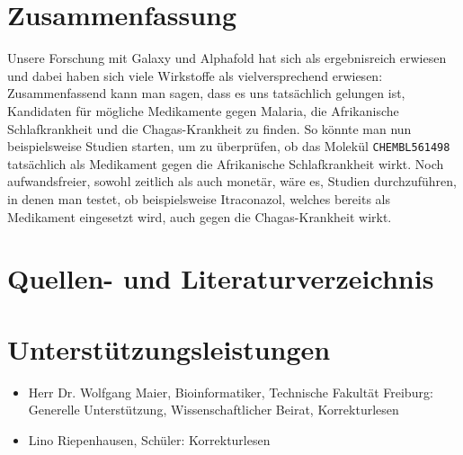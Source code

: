 \documentclass[10pt]{article}
\begin{document}
    \section{Zusammenfassung}\label{sec:zusammenfassung}
    Unsere Forschung mit Galaxy und Alphafold hat sich als ergebnisreich erwiesen und dabei haben sich viele
    Wirkstoffe als vielversprechend erwiesen: Zusammenfassend kann man sagen, dass es uns tatsächlich gelungen ist,
    Kandidaten für mögliche Medikamente gegen Malaria, die Afrikanische Schlafkrankheit und die Chagas-Krankheit zu
    finden.
    So könnte man nun beispielsweise Studien starten, um zu überprüfen, ob das Molekül \texttt{CHEMBL561498}
    tatsächlich als Medikament gegen die Afrikanische Schlafkrankheit wirkt.
    Noch aufwandsfreier, sowohl zeitlich als
    auch monetär, wäre es, Studien durchzuführen, in denen man testet, ob beispielsweise Itraconazol, welches bereits
    als Medikament eingesetzt wird, auch gegen die Chagas-Krankheit wirkt.


    \section{Quellen- und Literaturverzeichnis}\label{sec:quellen--und-literaturverzeichnis}

    


    \section{Unterstützungsleistungen}\label{sec:unterstuetzungsleistungen}

    \begin{itemize}
        \item Herr Dr. Wolfgang Maier, Bioinformatiker, Technische Fakultät Freiburg: Generelle Unterstützung,
        Wissenschaftlicher Beirat, Korrekturlesen

        \item Lino Riepenhausen, Schüler: Korrekturlesen
    \end{itemize}
\end{document}
